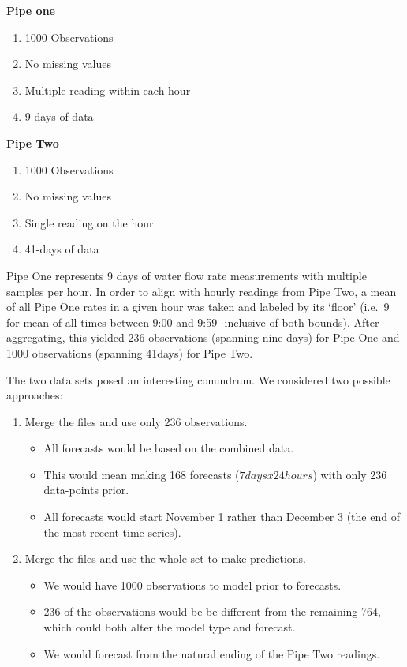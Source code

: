 \documentclass[openany]{book}
\providecommand{\tightlist}{%
  \setlength{\itemsep}{0pt}\setlength{\parskip}{0pt}}
\begin{document}
\begin{multicols}{2}

\textbf{Pipe one}
\begin{enumerate}
  \item 1000 Observations
  \item No missing values
  \item Multiple reading within each hour
  \item 9-days of data
\end{enumerate}

\textbf{Pipe Two}
\begin{enumerate}
  \item 1000 Observations
  \item No missing values
  \item Single reading on the hour
  \item 41-days of data  
\end{enumerate}

\end{multicols}

Pipe One represents 9 days of water flow rate measurements with multiple
samples per hour. In order to align with hourly readings from Pipe Two,
a mean of all Pipe One rates in a given hour was taken and labeled by
its `floor' (i.e.~9 for mean of all times between 9:00 and 9:59
-inclusive of both bounds). After aggregating, this yielded 236
observations (spanning nine days) for Pipe One and 1000 observations
(spanning 41days) for Pipe Two.

The two data sets posed an interesting conundrum. We considered two
possible approaches:

\begin{enumerate}
\def\labelenumi{(\arabic{enumi})}
\tightlist
\item
  Merge the files and use only 236 observations.

  \begin{itemize}
    \item All forecasts would be based on the combined data. 
    \item This would mean making 168 forecasts ($7days x 24hours$) with only 236 data-points prior.
    \item All forecasts would start November 1 rather than December 3 (the end of the most recent time series).
  \end{itemize}
\item
  Merge the files and use the whole set to make predictions.

  \begin{itemize}
    \item We would have 1000 observations to model prior to forecasts. 
    \item 236 of the observations would be be different from the remaining 764, which could both alter the model type and forecast. 
    \item We would forecast from the natural ending of the Pipe Two readings.
  \end{itemize}
\end{enumerate}
\end{document}

